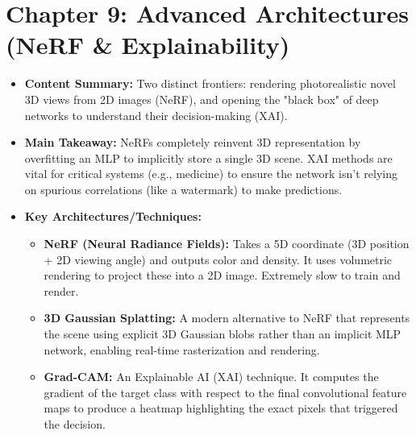 \section*{Chapter 9: Advanced Architectures (NeRF \& Explainability)}
\begin{itemize}
    \item \textbf{Content Summary:} Two distinct frontiers: rendering photorealistic novel 3D views from 2D images (NeRF), and opening the "black box" of deep networks to understand their decision-making (XAI).
    \item \textbf{Main Takeaway:} NeRFs completely reinvent 3D representation by overfitting an MLP to implicitly store a single 3D scene. XAI methods are vital for critical systems (e.g., medicine) to ensure the network isn't relying on spurious correlations (like a watermark) to make predictions.
    \item \textbf{Key Architectures/Techniques:}
    \begin{itemize}
        \item \textbf{NeRF (Neural Radiance Fields):} Takes a 5D coordinate (3D position + 2D viewing angle) and outputs color and density. It uses volumetric rendering to project these into a 2D image. Extremely slow to train and render.
        \item \textbf{3D Gaussian Splatting:} A modern alternative to NeRF that represents the scene using explicit 3D Gaussian blobs rather than an implicit MLP network, enabling real-time rasterization and rendering.
        \item \textbf{Grad-CAM:} An Explainable AI (XAI) technique. It computes the gradient of the target class with respect to the final convolutional feature maps to produce a heatmap highlighting the exact pixels that triggered the decision.
    \end{itemize}
\end{itemize}
